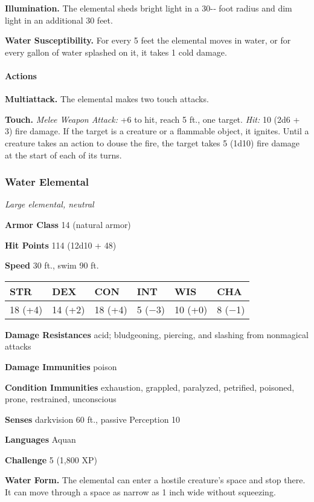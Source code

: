 \documentclass[
]{article}
\begin{document}
\textbf{Illumination.} The elemental sheds bright light in a 30-­‐ foot
radius and dim light in an additional 30 feet.

\textbf{Water Susceptibility.} For every 5 feet the elemental moves in
water, or for every gallon of water splashed on it, it takes 1 cold
damage.

\hypertarget{actions-2}{%
\paragraph{Actions}\label{actions-2}}

\textbf{Multiattack.} The elemental makes two touch attacks.

\textbf{Touch.} \emph{Melee Weapon Attack:} +6 to hit, reach 5 ft., one
target. \emph{Hit:} 10 (2d6 + 3) fire damage. If the target is a
creature or a flammable object, it ignites. Until a creature takes an
action to douse the fire, the target takes 5 (1d10) fire damage at the
start of each of its turns.

\hypertarget{water-elemental}{%
\subsubsection{Water Elemental}\label{water-elemental}}

\emph{Large elemental, neutral}

\textbf{Armor Class} 14 (natural armor)

\textbf{Hit Points} 114 (12d10 + 48)

\textbf{Speed} 30 ft., swim 90 ft.

\begin{longtable}[]{@{}llllll@{}}
\toprule
STR & DEX & CON & INT & WIS & CHA\tabularnewline
\midrule
\endhead
18 (+4) & 14 (+2) & 18 (+4) & 5 (−3) & 10 (+0) & 8 (−1)\tabularnewline
\bottomrule
\end{longtable}

\textbf{Damage Resistances} acid; bludgeoning, piercing, and slashing
from nonmagical attacks

\textbf{Damage Immunities} poison

\textbf{Condition Immunities} exhaustion, grappled, paralyzed,
petrified, poisoned, prone, restrained, unconscious

\textbf{Senses} darkvision 60 ft., passive Perception 10

\textbf{Languages} Aquan

\textbf{Challenge} 5 (1,800 XP)

\textbf{Water Form.} The elemental can enter a hostile creature's space
and stop there. It can move through a space as narrow as 1 inch wide
without squeezing.
\end{document}
